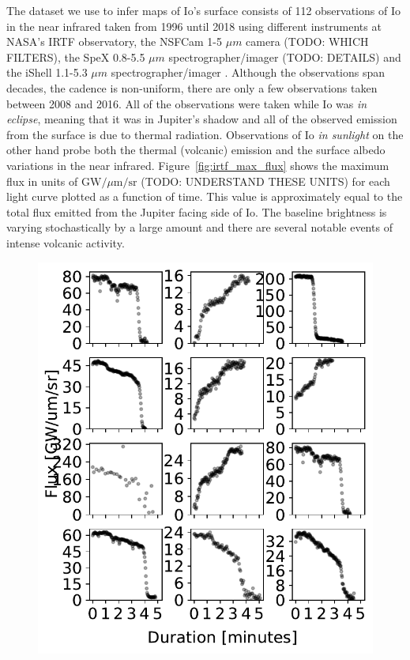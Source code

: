 \documentclass[modern]{aastex62}
\begin{document}
The dataset we use to infer maps of Io's surface consists of 112 observations of Io in the near infrared taken from 1996 until 2018 using different instruments at NASA's IRTF observatory, the NSFCam  1-5 $\mu m$ camera \citep{shure1994} (TODO: WHICH FILTERS), the SpeX 0.8-5.5 $\mu m$ spectrographer/imager \citep{rayner2003} (TODO: DETAILS) and the iShell 1.1-5.3 $\mu m$  spectrographer/imager \citep{johnrayner2016}.
Although the observations span decades, the cadence is non-uniform, there are only a few observations taken between 2008 and 2016.
All of the observations were taken while Io was \emph{in eclipse}, meaning that it was in Jupiter's shadow and all of the observed emission from the surface is due to thermal radiation.
Observations of Io \emph{in sunlight} on the other hand probe both the thermal (volcanic) emission and the surface albedo variations in the near infrared.
Figure~\ref{fig:irtf_max_flux} shows the maximum flux in units of $\mathrm{GW}/\mu \mathrm{m}/\mathrm{sr}$ (TODO: UNDERSTAND THESE UNITS) for each light curve plotted as a function of time.
This value is approximately equal to the total flux emitted from the Jupiter facing side of Io.
The baseline brightness is varying stochastically by a large amount and there are several notable events of intense volcanic activity.

\begin{figure}[h!]
    \begin{centering}
        \includegraphics[width=0.7\linewidth]{figures/irtf_sample_lightcurves.pdf}
    \end{centering}
\end{figure}
\end{document}

